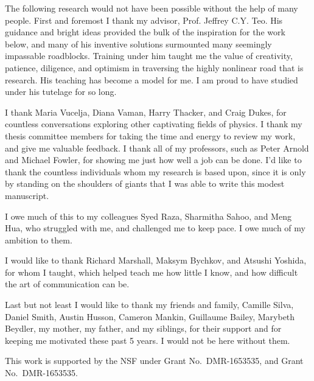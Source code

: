 \begin{acknowledgments}
The following research would not have been possible without the help of many people. First and foremost I thank my advisor, Prof. Jeffrey C.Y. Teo. His guidance and bright ideas provided the bulk of the inspiration for the work below, and many of his inventive solutions surmounted many seemingly impassable roadblocks. Training under him taught me the value of creativity, patience, diligence, and optimism in traversing the highly nonlinear road that is research. His teaching has become a model for me. I am proud to have studied under his tutelage for so long.

I thank Maria Vucelja, Diana Vaman, Harry Thacker, and Craig Dukes, for countless conversations exploring other captivating fields of physics. I thank my thesis committee members for taking the time and energy to review my work, and give me valuable feedback. I thank all of my professors, such as Peter Arnold and Michael Fowler, for showing me just how well a job can be done. I'd like to thank the countless individuals whom my research is based upon, since it is only by standing on the shoulders of giants that I was able to write this modest manuscript.

I owe much of this to my colleagues Syed Raza, Sharmitha Sahoo, and Meng Hua, who struggled with me, and challenged me to keep pace. I owe much of my ambition to them.

I would like to thank Richard Marshall, Maksym Bychkov, and Atsushi Yoshida, for whom I taught, which helped teach me how little I know, and how difficult the art of communication can be.

Last but not least I would like to thank my friends and family, Camille Silva, Daniel Smith, Austin Husson, Cameron Mankin, Guillaume Bailey, Marybeth Beydler, my mother, my father, and my siblings, for their support and for keeping me motivated these past 5 years. I would not be here without them.
	
This work is supported by the NSF under Grant No.~DMR-1653535, and Grant No.~DMR-1653535.

\end{acknowledgments}